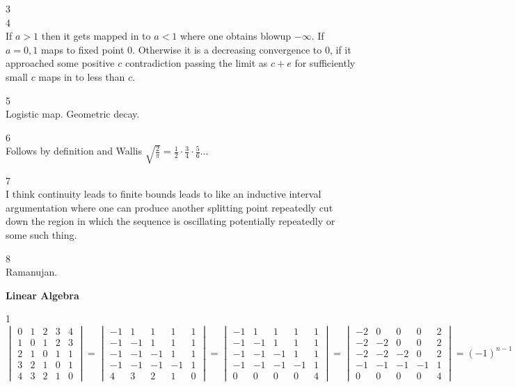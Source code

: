 3 \\


4 \\
If $a>1$ then it gets mapped in to $a<1$ where one obtains blowup $-\infty$. If $a=0,1$ maps to fixed point $0$. Otherwise it is a decreasing convergence to $0$, if it approached some positive $c$ contradiction passing the limit as $c+e$ for sufficiently small $c$ maps in to less than $c$.

5 \\
Logistic map. Geometric decay.

6 \\
Follows by definition and Wallis $\sqrt{\frac{2}{\pi}}=\frac{1}{2} \cdot \frac{3}{4} \cdot \frac{5}{6} \dots$

7 \\
I think continuity leads to finite bounds leads to like an inductive interval argumentation where one can produce another splitting point repeatedly cut down the region in which the sequence is oscillating potentially repeatedly or some such thing.

8 \\
Ramanujan.

\newpage

\textbf{Linear Algebra}

1 \\
$
\begin{vmatrix}
0 & 1 & 2 & 3 & 4 \\
1 & 0 & 1 & 2 & 3 \\
2 & 1 & 0 & 1 & 1 \\
3 & 2 & 1 & 0 & 1 \\
4 & 3 & 2 & 1 & 0
\end{vmatrix}
=
\begin{vmatrix}
-1 & 1 & 1 & 1 & 1 \\
-1 & -1 & 1 & 1 & 1 \\
-1 & -1 & -1 & 1 & 1 \\
-1 & -1 & -1 & -1 & 1 \\
4 & 3 & 2 & 1 & 0
\end{vmatrix}
=
\begin{vmatrix}
-1 & 1 & 1 & 1 & 1 \\
-1 & -1 & 1 & 1 & 1 \\
-1 & -1 & -1 & 1 & 1 \\
-1 & -1 & -1 & -1 & 1 \\
0 & 0 & 0 & 0 & 4
\end{vmatrix}
=
\begin{vmatrix}
-2 & 0 & 0 & 0 & 2 \\
-2 & -2 & 0 & 0 & 2 \\
-2 & -2 & -2 & 0 & 2 \\
-1 & -1 & -1 & -1 & 1 \\
0 & 0 & 0 & 0 & 4
\end{vmatrix}
=
\boxed{(-1)^{n-1}(n-1)2^{n-2}}
$

